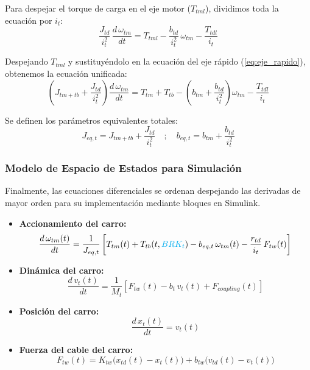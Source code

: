 \documentclass[11pt]{article}                                    %
\begin{document}
Para despejar el torque de carga en el eje motor ($T_{tml}$), dividimos toda la ecuación por $i_t$:
\begin{equation}
    \frac{J_{td}}{i_t^2}\, \frac{d \, \omega_{tm}}{dt} = T_{tml} - \frac{b_{td}}{i_t^2} \, \omega_{tm} - \frac{T_{tdl}}{i_t}
\end{equation}

Despejando $T_{tml}$ y sustituyéndolo en la ecuación del eje rápido (\ref{eq:eje_rapido}), obtenemos la ecuación unificada:
\begin{equation}
    \left( J_{tm+tb} + \frac{J_{td}}{i_t^2} \right) \frac{d \, \omega_{tm}}{dt} = T_{tm} + T_{tb} - \left( b_{tm} + \frac{b_{td}}{i_t^2} \right) \omega_{tm} - \frac{T_{tdl}}{i_t}
\end{equation}

Se definen los parámetros equivalentes totales:
\begin{equation} \label{eq:parametros_eq}
    J_{eq,t} = J_{tm+tb} + \frac{J_{td}}{i_t^2} \quad ; \quad 
    b_{eq,t} = b_{tm} + \frac{b_{td}}{i_t^2}
\end{equation}

\subsubsection{Modelo de Espacio de Estados para Simulación}
Finalmente, las ecuaciones diferenciales se ordenan despejando las derivadas de mayor orden para su implementación mediante bloques en Simulink.
\begin{itemize}
    \item \textbf{Accionamiento del carro:}
    \begin{equation}
        \frac{d\,\omega_{tm}(t)}{dt}
        = \frac{1}{J_{eq,t}}
        \left[
            T_{tm}(t)
            + T_{tb}(t,\textcolor{cyan}{BRK_t})
            - b_{eq,t}\,\omega_{tm}(t)
            - \frac{r_{td}}{i_t}\,F_{tw}(t)
        \right]
        \label{accionamiento_carro}
    \end{equation}

    \item \textbf{Dinámica del carro:}
    \begin{equation}
        \frac{d\,v_t(t)}{dt}
        = \frac{1}{M_t}
        \left[
            F_{tw}(t)
            - b_t\,v_t(t)
            + F_{coupling}(t)
        \right]
        \label{eq:carro_dinamica}
    \end{equation}

    \item \textbf{Posición del carro:}
    \begin{equation}
        \frac{d\,x_t(t)}{dt} = v_t(t)
        \label{eq:carro_posicion}
    \end{equation}

    \item \textbf{Fuerza del cable del carro:}
    \begin{equation}
        F_{tw}(t)
        = K_{tw}\bigl(x_{td}(t) - x_t(t)\bigr)
        + b_{tw}\bigl(v_{td}(t) - v_t(t)\bigr)
    \end{equation}
\end{itemize}
        
\end{document}
